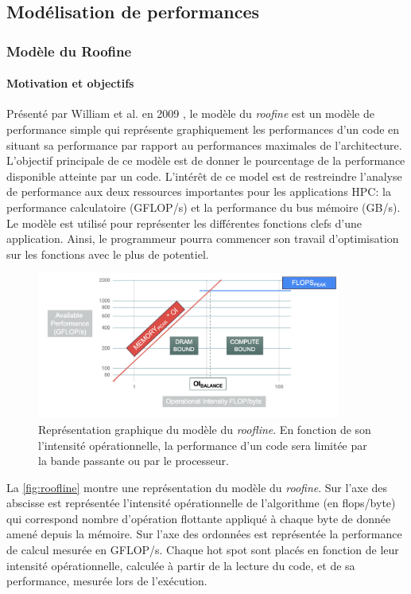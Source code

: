 \subsection{Modélisation de performances}


\subsubsection{Modèle du Roofine} \label{sec:roofline}

\paragraph{Motivation et objectifs}
Présenté par William et al. en 2009 \cite{Williams2008}, le modèle du \textit{roofine} est un modèle de performance simple qui représente graphiquement les performances d’un code en situant sa performance par rapport au performances maximales de l’architecture. L’objectif principale de ce modèle est de donner le pourcentage de la performance disponible atteinte par un code. L’intérêt de ce model est de restreindre l’analyse de performance aux deux ressources importantes pour les applications HPC: la performance calculatoire (GFLOP/s) et la performance du bus mémoire (GB/s).
Le modèle est utilisé pour représenter les différentes fonctions clefs d’une application. Ainsi, le programmeur pourra commencer son travail d’optimisation sur les fonctions avec le plus de potentiel.

\begin{figure}
    \center
    \includegraphics[width=10cm]{images/roofline.png}
    \caption{\label{fig:roofline} Représentation graphique du modèle du \textit{roofline}. En fonction de son l'intensité opérationnelle, la performance d'un code sera limitée par la bande passante ou par le processeur.}
\end{figure}


La \autoref{fig:roofline} montre une représentation du modèle du \textit{roofine}. Sur l’axe des abscisse est représentée l’intensité opérationnelle de l’algorithme (en flops/byte) qui correspond nombre d’opération flottante appliqué à chaque byte de donnée amené depuis la mémoire. Sur l’axe des ordonnées est représentée la performance de calcul mesurée en GFLOP/s.
Chaque hot spot sont placés en fonction de leur intensité opérationnelle, calculée à partir de la lecture du code, et de sa performance, mesurée lors de l’exécution.

